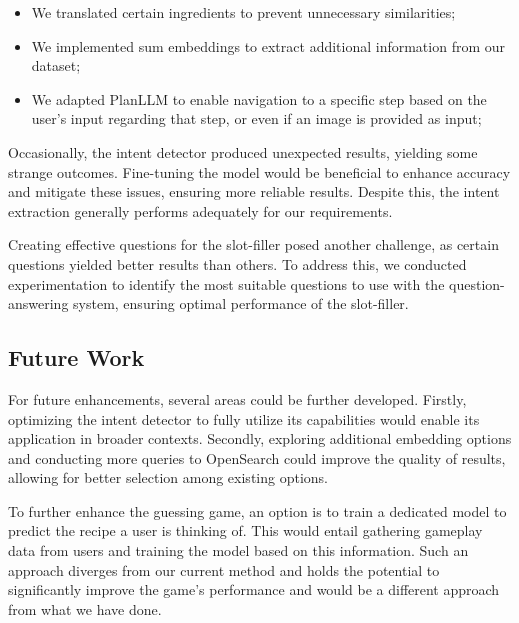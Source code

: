 \documentclass[runningheads]{llncs}
\begin{document}
\begin{itemize}
	\item We translated certain ingredients to prevent unnecessary similarities;
	\item We implemented sum embeddings to extract additional information from our dataset;
	\item We adapted PlanLLM to enable navigation to a specific step based on the user's input regarding that step, or even if an image is provided as input;
\end{itemize}

Occasionally, the intent detector produced unexpected results, yielding some strange outcomes. Fine-tuning the model would be beneficial to enhance accuracy and mitigate these issues, ensuring more reliable results. Despite this, the intent extraction generally performs adequately for our requirements.

Creating effective questions for the slot-filler posed another challenge, as certain questions yielded better results than others. To address this, we conducted experimentation to identify the most suitable questions to use with the question-answering system, ensuring optimal performance of the slot-filler.

\subsection{Future Work}
For future enhancements, several areas could be further developed. Firstly, optimizing the intent detector to fully utilize its capabilities would enable its application in broader contexts. Secondly, exploring additional embedding options and conducting more queries to OpenSearch could improve the quality of results, allowing for better selection among existing options.

To further enhance the guessing game, an option is to train a dedicated model to predict the recipe a user is thinking of. This would entail gathering gameplay data from users and training the model based on this information. Such an approach diverges from our current method and holds the potential to significantly improve the game's performance and would be a different approach from what we have done.



\end{document}
